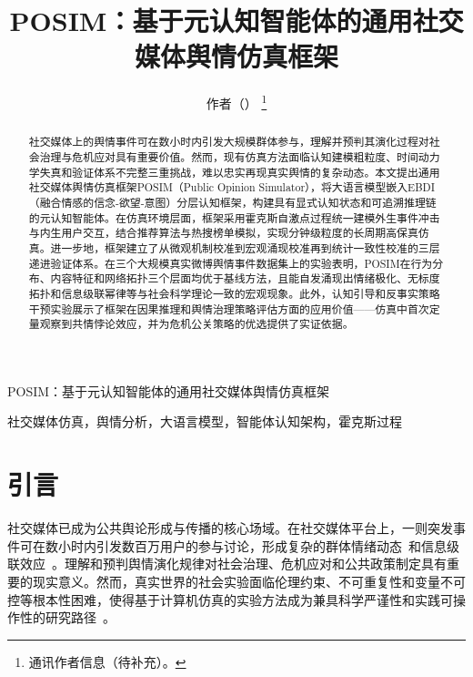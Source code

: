 \documentclass[lettersize,journal]{IEEEtran}
\begin{document}
\raggedbottom

\title{POSIM：基于元认知智能体的通用社交媒体舆情仿真框架}

\author{作者（）%
\thanks{通讯作者信息（待补充）。}}

%
{POSIM：基于元认知智能体的通用社交媒体舆情仿真框架}

\maketitle

\begin{abstract}
社交媒体上的舆情事件可在数小时内引发大规模群体参与，理解并预判其演化过程对社会治理与危机应对具有重要价值。然而，现有仿真方法面临认知建模粗粒度、时间动力学失真和验证体系不完整三重挑战，难以忠实再现真实舆情的复杂动态。本文提出通用社交媒体舆情仿真框架POSIM（Public Opinion Simulator），将大语言模型嵌入EBDI（融合情感的信念-欲望-意图）分层认知框架，构建具有显式认知状态和可追溯推理链的元认知智能体。在仿真环境层面，框架采用霍克斯自激点过程统一建模外生事件冲击与内生用户交互，结合推荐算法与热搜榜单模拟，实现分钟级粒度的长周期高保真仿真。进一步地，框架建立了从微观机制校准到宏观涌现校准再到统计一致性校准的三层递进验证体系。在三个大规模真实微博舆情事件数据集上的实验表明，POSIM在行为分布、内容特征和网络拓扑三个层面均优于基线方法，且能自发涌现出情绪极化、无标度拓扑和信息级联幂律等与社会科学理论一致的宏观现象。此外，认知引导和反事实策略干预实验展示了框架在因果推理和舆情治理策略评估方面的应用价值——仿真中首次定量观察到共情悖论效应，并为危机公关策略的优选提供了实证依据。
\end{abstract}

\begin{IEEEkeywords}
社交媒体仿真，舆情分析，大语言模型，智能体认知架构，霍克斯过程
\end{IEEEkeywords}


\section{引言}

社交媒体已成为公共舆论形成与传播的核心场域。在社交媒体平台上，一则突发事件可在数小时内引发数百万用户的参与讨论，形成复杂的群体情绪动态~\cite{gonzalez_emotional_2010}和信息级联效应~\cite{goldstein_structure_2012}。理解和预判舆情演化规律对社会治理、危机应对和公共政策制定具有重要的现实意义。然而，真实世界的社会实验面临伦理约束、不可重复性和变量不可控等根本性困难，使得基于计算机仿真的实验方法成为兼具科学严谨性和实践可操作性的研究路径~\cite{bonabeau_agent-based_2002}。
\end{document}
